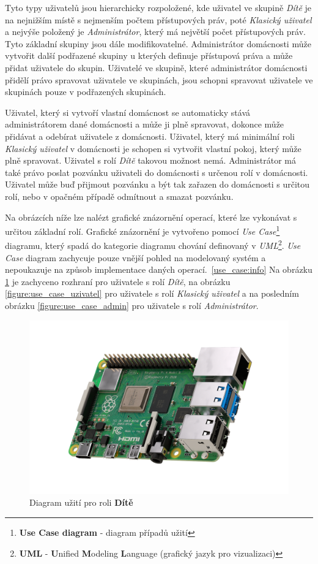 Tyto typy uživatelů jsou hierarchicky rozpoložené, kde uživatel ve skupině \emph{Dítě} je na nejnižším místě s nejmenším počtem přístupových práv, poté \emph{Klasický uživatel} a nejvýše položený je \emph{Administrátor}, který má největší počet přístupových práv.
Tyto základní skupiny jsou dále modifikovatelné. Administrátor domácnosti může vytvořit další podřazené skupiny u kterých definuje přístupová práva a může přidat uživatele do skupin.
Uživatelé ve skupině, které administrátor domácnosti přidělí právo spravovat uživatele ve skupinách, jsou schopni spravovat uživatele ve skupinách pouze v podřazených skupinách.

Uživatel, který si vytvoří vlastní domácnost se automaticky stává administrátorem dané domácnosti a může ji plně spravovat, dokonce může přidávat a odebírat uživatele z domácnosti.
Uživatel, který má minimální roli \emph{Klasický uživatel} v domácnosti je schopen si vytvořit vlastní pokoj, který může plně spravovat. Uživatel s rolí \emph{Dítě} takovou možnost nemá.
Administrátor má také právo poslat pozvánku uživateli do domácnosti s určenou rolí v domácnosti. Uživatel může buď přijmout pozvánku a být tak zařazen do domácnosti s určitou rolí, nebo v opačném případě odmítnout a smazat pozvánku.
\newline

Na obrázcích níže lze nalézt grafické znázornění operací, které lze vykonávat s určitou základní rolí.
Grafické znázornění je vytvořeno pomocí \emph{Use Case}\footnote{\textbf{Use Case diagram} - diagram případů užití} diagramu, který spadá do kategorie diagramu chování definovaný v \emph{UML}\footnote{\textbf{UML} - \textbf{U}nified \textbf{M}odeling \textbf{L}anguage (grafický jazyk pro vizualizaci)}.
\emph{Use Case} diagram zachycuje pouze vnější pohled na modelovaný systém a nepoukazuje na způsob implementace daných operací.~\ref{use_case:info}
Na obrázku \ref{figure:use_case_dite} je zachyceno rozhraní pro uživatele s rolí \emph{Dítě}, na obrázku \ref{figure:use_case_uzivatel} pro uživatele s rolí \emph{Klasický uživatel} a na posledním obrázku \ref{figure:use_case_admin} pro uživatele s rolí \emph{Administrátor}.

\begin{figure}[hbt]
  \centering
  \includegraphics[width=0.4 \linewidth]{obrazky-figures/raspberry.png}
  \caption{Diagram užití pro roli \textbf{Dítě}}
  \label{figure:use_case_dite}
\end{figure}

